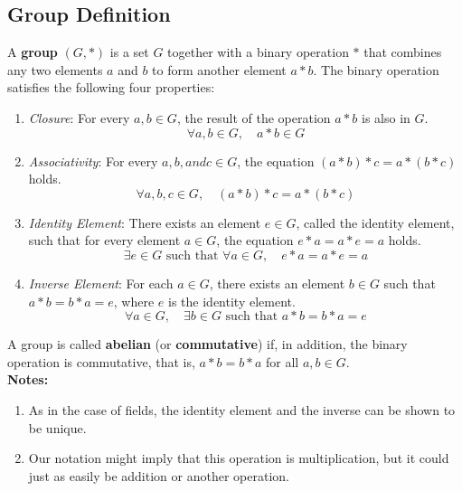 \documentclass{article}
\begin{document}



\subsection{Group Definition}

A \textbf{group} $(G, *)$ is a set $G$ together with a binary operation $*$ that combines any two elements $a$ and $b$ to form another element $a * b$. The binary operation satisfies the following four properties:

\begin{enumerate}
    \item \textit{Closure}: For every $a, b \in G$, the result of the operation $a * b$ is also in $G$.
    \[
    \forall a, b \in G, \quad a * b \in G
    \]

    \item \textit{Associativity}: For every $a, b, and c \in G$, the equation $(a * b) * c = a * (b * c)$ holds.
    \[
    \forall a, b, c \in G, \quad (a * b) * c = a * (b * c)
    \]

    \item\textit{Identity Element}: There exists an element $e \in G$, called the identity element, such that for every element $a \in G$, the equation $e * a = a * e = a$ holds.
    \[
    \exists e \in G \text{ such that } \forall a \in G, \quad e * a = a * e = a
    \]

    \item \textit{Inverse Element}: For each $a \in G$, there exists an element $b \in G$ such that $a * b = b * a = e$, where $e$ is the identity element.
    \[
    \forall a \in G, \quad \exists b \in G \text{ such that } a * b = b * a = e
    \]
\end{enumerate}

A group is called \textbf{abelian} (or \textbf{commutative}) if, in addition, the binary operation is commutative, that is, $a * b = b * a$ for all $a, b \in G$.\\

\textbf{Notes:}
\begin{enumerate}
\item As in the case of fields, the identity element and the inverse can be shown to be unique.
\item Our notation might imply that this operation is multiplication, but it could just as easily be addition or
another operation.
\end{enumerate}
\end{document}
